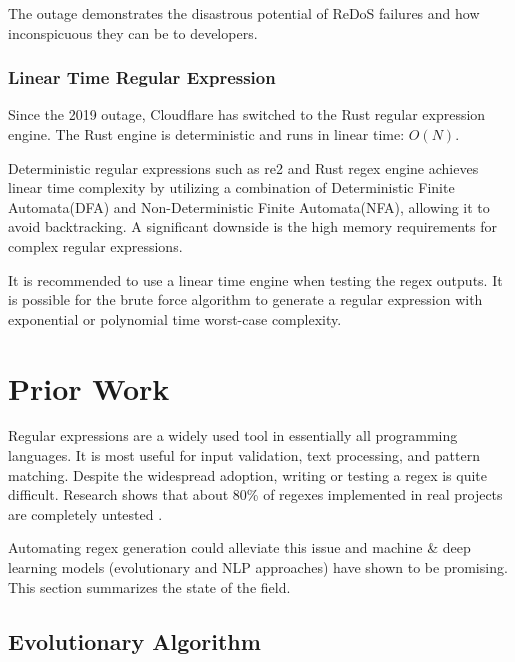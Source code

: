 \documentclass[10pt,twocolumn]{article}
\begin{document}
The outage demonstrates the disastrous potential of ReDoS failures and how inconspicuous they can be to developers.

\subsubsection{Linear Time Regular Expression}

Since the 2019 outage, Cloudflare has switched to the Rust regular expression engine. The Rust engine is deterministic and runs in linear time: $O(N)$. 

Deterministic regular expressions such as re2 and Rust regex engine achieves linear time complexity by utilizing a combination of Deterministic Finite Automata(DFA) and Non-Deterministic Finite Automata(NFA), allowing it to avoid backtracking\cite{deterministic}\cite{cox2010}. A significant downside is the high memory requirements for complex regular expressions.

It is recommended to use a linear time engine when testing the regex outputs. It is possible for the brute force algorithm to generate a regular expression with exponential or polynomial time worst-case complexity.

\section{Prior Work}

Regular expressions are a widely used tool in essentially all programming languages. It is most useful for input validation, text processing, and pattern matching. Despite the widespread adoption, writing or testing a regex is quite difficult. Research shows that about 80\% of regexes implemented in real projects are completely untested \cite{Zheng2021}. 

Automating regex generation could alleviate this issue and machine \& deep learning models (evolutionary and NLP approaches) have shown to be promising. This section summarizes the state of the field.

\subsection{Evolutionary Algorithm}
\end{document}
